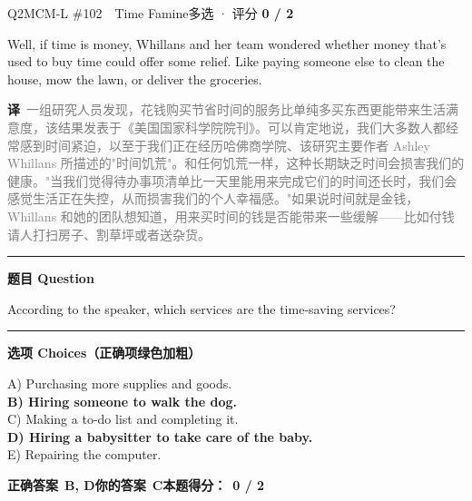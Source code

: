 \documentclass[11pt]{article}
\newcommand{\ptesub}[1]{%
  \par\needspace{2\baselineskip}\smallskip
  {\color{cAccent}\rule[-0.2ex]{3pt}{1.05em}}\hspace{6pt}%
  {\bfseries\color{cHead}#1}\par\nopagebreak\smallskip}
\newcommand{\zh}[1]{{\footnotesize\textcolor{cNote}{\textbf{译}}\ \textcolor{gray}{#1}}}
\begin{document}
\begin{qblock}{Q2\quad MCM-L \#102\ \ Time Famine}{多选 · 评分 \textcolor{cAccent}{\bfseries 0 / 2}}
\begin{promptbox}
Well, if time is money, Whillans and her team wondered whether money that's used to buy time could offer some relief. Like paying someone else to clean the house, mow the lawn, or deliver the groceries.
\end{promptbox}
\zh{一组研究人员发现，花钱购买节省时间的服务比单纯多买东西更能带来生活满意度，该结果发表于《美国国家科学院院刊》。可以肯定地说，我们大多数人都经常感到时间紧迫，以至于我们正在经历哈佛商学院、该研究主要作者 Ashley Whillans 所描述的"时间饥荒"。和任何饥荒一样，这种长期缺乏时间会损害我们的健康。"当我们觉得待办事项清单比一天里能用来完成它们的时间还长时，我们会感觉生活正在失控，从而损害我们的个人幸福感。"如果说时间就是金钱，Whillans 和她的团队想知道，用来买时间的钱是否能带来一些缓解——比如付钱请人打扫房子、割草坪或者送杂货。}
\ptesub{题目 Question}
\begin{notebox}According to the speaker, which services are the time-saving services?\end{notebox}
\ptesub{选项 Choices（正确项绿色加粗）}
{\small
A) Purchasing more supplies and goods.\\
{\color{cFix}\textbf{B) Hiring someone to walk the dog.}}\\
C) Making a to-do list and completing it.\\
{\color{cFix}\textbf{D) Hiring a babysitter to take care of the baby.}}\\
E) Repairing the computer.}
\par\smallskip
\textbf{正确答案}\ \textcolor{cFix}{\bfseries B, D}\qquad\textbf{你的答案}\ {\color{cWrong}\bfseries C}\qquad\textbf{本题得分：}\ {\color{cAccent}\bfseries 0 / 2}
\end{qblock}
\end{document}

